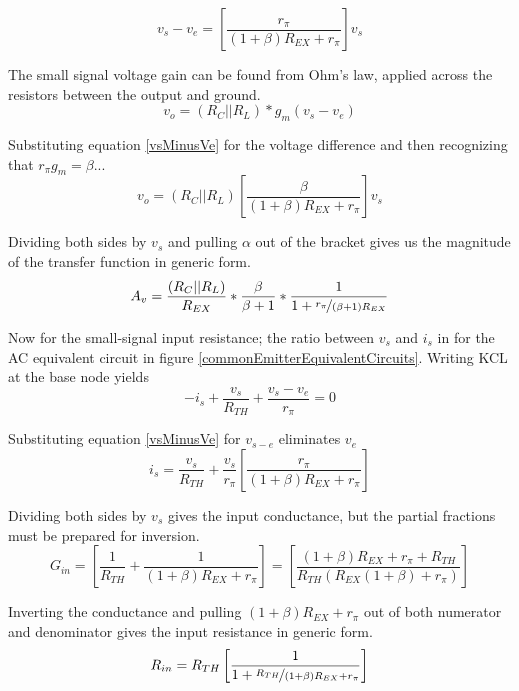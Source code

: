 \documentclass[titlepage, letterpaper, 11pt]{article}
\begin{document}
\begin{equation}
v_{s}-v_{e}=
\left[\frac{r_{\pi}}{(1+\beta)R_{EX}+r_{\pi}}\right]v_{s}
\label{vsMinusVe}
\end{equation}

The small signal voltage gain can be found from Ohm's law, applied
across the resistors between the output and ground.
\begin{equation*}
v_{o}=(R_{C}||R_{L})*g_{m}(v_{s}-v_{e})
\end{equation*}

Substituting equation \ref{vsMinusVe} for the voltage difference and
then recognizing that $r_{\pi}g_{m}=\beta$...
\begin{equation*}
v_{o}=(R_{C}||R_{L})
\left[\frac{\beta}{(1+\beta)R_{EX}+r_{\pi}}\right]v_{s}
\end{equation*}

Dividing both sides by $v_{s}$ and pulling $\alpha$ out of the
bracket gives us the magnitude of the transfer function in generic
form.
\begin{equation}
A_{v}=\frac{(R_{C}||R_{L})}{R_{EX}}*\frac{\beta}{\beta+1}*
\frac{1}{1+\nicefrac{r_{\pi}}{(\beta+1)R_{EX}}}
\label{ceAv}
\end{equation}

Now for the small-signal input resistance; the ratio between
$v_{s}$ and $i_{s}$ in for the AC equivalent circuit in figure
\ref{commonEmitterEquivalentCircuits}. Writing KCL at the base node
yields
\begin{equation*}
-i_{s}+\frac{v_{s}}{R_{TH}}+\frac{v_{s}-v_{e}}{r_{\pi}}=0
\end{equation*}

Substituting equation \ref{vsMinusVe} for $v_{s-e}$ 
eliminates $v_{e}$
\begin{equation*}
i_{s}=\frac{v_{s}}{R_{TH}}+\frac{v_{s}}{r_{\pi}}
\left[\frac{r_{\pi}}{(1+\beta)R_{EX}+r_{\pi}}\right]
\end{equation*}

Dividing both sides by $v_{s}$ gives the input conductance,
but the partial fractions must be prepared for inversion.
\begin{equation*}
G_{in}=
\left[\frac{1}{R_{TH}}+\frac{1}{(1+\beta)R_{EX}+r_{\pi}}\right]=
\left[\frac{(1+\beta)R_{EX}+r_{\pi}+R_{TH}}
{R_{TH}(R_{EX}(1+\beta)+r_{\pi})}\right]
\end{equation*}

Inverting the conductance and pulling
$(1+\beta)R_{EX}+r_{\pi}$ out of both numerator and denominator gives
the input resistance in generic form.
\begin{equation*}
R_{in}=R_{TH}
\left[\frac{1}{1+\nicefrac{R_{TH}}{(1+\beta)R_{EX}+r_{\pi}}}\right]
\end{equation*}
\end{document}
